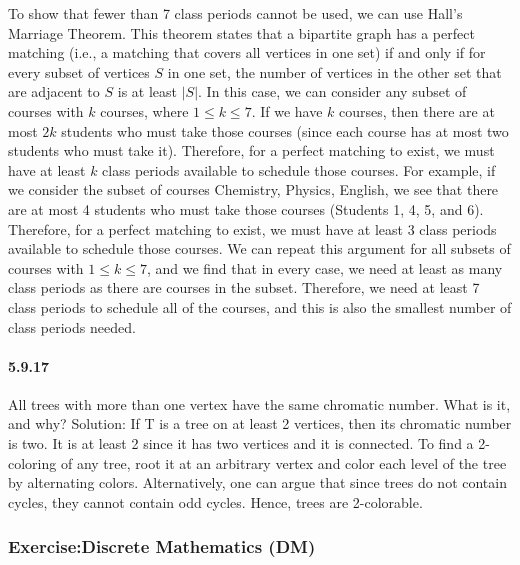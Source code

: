 \documentclass{article}
\begin{document}
\newline
To show that fewer than 7 class periods cannot be used, we can use Hall's Marriage Theorem. This theorem states that a bipartite graph has a perfect matching (i.e., a matching that covers all vertices in one set) if and only if for every subset of vertices $S$ in one set, the number of vertices in the other set that are adjacent to $S$ is at least $|S|$.
\newline
In this case, we can consider any subset of courses with $k$ courses, where $1 \leq k \leq 7$. If we have $k$ courses, then there are at most $2k$ students who must take those courses (since each course has at most two students who must take it). Therefore, for a perfect matching to exist, we must have at least $k$ class periods available to schedule those courses.
\newline
For example, if we consider the subset of courses {Chemistry, Physics, English}, we see that there are at most 4 students who must take those courses (Students 1, 4, 5, and 6). Therefore, for a perfect matching to exist, we must have at least 3 class periods available to schedule those courses.
\newline
We can repeat this argument for all subsets of courses with $1 \leq k \leq 7$, and we find that in every case, we need at least as many class periods as there are courses in the subset. Therefore, we need at least 7 class periods to schedule all of the courses, and this is also the smallest number of class periods needed.
\paragraph{5.9.17}
All trees with more than one vertex have the same chromatic number. What is it, and why?\newline
Solution:\newline
If T is a tree on at least 2 vertices, then its chromatic number is two. It is at least 2 since it has two vertices and it is connected. To find a 2-coloring of any tree, root it at an arbitrary vertex and color each level of the tree by alternating colors. Alternatively, one can argue that since trees do not contain cycles, they cannot contain odd cycles. Hence, trees are 2-colorable.
\subsubsection{Exercise:Discrete Mathematics (DM)}
\end{document}
